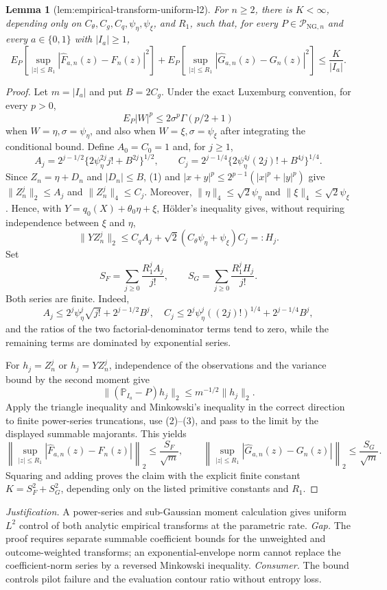 \documentclass{article}
\newtheorem{lemma}{Lemma}
\begin{document}
\begin{lemma}[lem:empirical-transform-uniform-l2]\label{lem:empirical-transform-uniform-l2}
For \(n\ge2\), there is \(K<\infty\), depending only on \(C_{\theta},C_g,C_q,\psi_{\eta},\psi_{\xi}\), and \(R_1\), such that, for every \(P\in\mathcal P_{\mathrm{NG},n}\) and every \(a\in\{0,1\}\) with \(|I_a|\ge1\),
\[
 E_P\!\left[\sup_{|z|\le R_1}|\widehat F_{a,n}(z)-F_n(z)|^2\right]
 +E_P\!\left[\sup_{|z|\le R_1}|\widehat G_{a,n}(z)-G_n(z)|^2\right]
 \le \frac{K}{|I_a|}.
\]
\end{lemma}
\begin{proof}
Let \(m=|I_a|\) and put \(B=2C_g\).  Under the exact Luxemburg convention, for every \(p>0\),
\[
 E_P|W|^p\le 2\sigma^p\Gamma(p/2+1) \tag{1}
\]
when \(W=\eta,\sigma=\psi_\eta\), and also when \(W=\xi,\sigma=\psi_\xi\) after integrating the conditional bound.  Define \(A_0=C_0=1\) and, for \(j\ge1\),
\[
 A_j=2^{j-1/2}\{2\psi_\eta^{2j}j!+B^{2j}\}^{1/2},\qquad
 C_j=2^{j-1/4}\{2\psi_\eta^{4j}(2j)!+B^{4j}\}^{1/4}.
\]
Since \(Z_n=\eta+D_n\) and \(|D_n|\le B\), (1) and \(|x+y|^p\le2^{p-1}(|x|^p+|y|^p)\) give \(\|Z_n^j\|_2\le A_j\) and \(\|Z_n^j\|_4\le C_j\).  Moreover, \(\|\eta\|_4\le\sqrt2\psi_\eta\) and \(\|\xi\|_4\le\sqrt2\psi_\xi\).  Hence, with \(Y=q_0(X)+\theta_0\eta+\xi\), Hölder's inequality gives, without requiring independence between \(\xi\) and \(\eta\),
\[
 \|YZ_n^j\|_2\le C_qA_j+\sqrt2(C_\theta\psi_\eta+\psi_\xi)C_j=:H_j. \tag{2}
\]
Set
\[
 S_F=\sum_{j\ge0}\frac{R_1^jA_j}{j!},\qquad S_G=\sum_{j\ge0}\frac{R_1^jH_j}{j!}.
\]
Both series are finite.  Indeed,
\[
 A_j\le2^j\psi_\eta^j\sqrt{j!}+2^{j-1/2}B^j,\quad
 C_j\le2^j\psi_\eta^j((2j)!)^{1/4}+2^{j-1/4}B^j,
\]
and the ratios of the two factorial-denominator terms tend to zero, while the remaining terms are dominated by exponential series.

For \(h_j=Z_n^j\) or \(h_j=YZ_n^j\), independence of the observations and the variance bound by the second moment give
\[
 \|(\mathbb P_{I_a}-P)h_j\|_2\le m^{-1/2}\|h_j\|_2. \tag{3}
\]
Apply the triangle inequality and Minkowski's inequality in the correct direction to finite power-series truncations, use (2)--(3), and pass to the limit by the displayed summable majorants.  This yields
\[
 \left\|\sup_{|z|\le R_1}|\widehat F_{a,n}(z)-F_n(z)|\right\|_2\le\frac{S_F}{\sqrt m},\qquad
 \left\|\sup_{|z|\le R_1}|\widehat G_{a,n}(z)-G_n(z)|\right\|_2\le\frac{S_G}{\sqrt m}.
\]
Squaring and adding proves the claim with the explicit finite constant \(K=S_F^2+S_G^2\), depending only on the listed primitive constants and \(R_1\).
\end{proof}
\par\smallskip\noindent \textit{Justification.} A power-series and sub-Gaussian moment calculation gives uniform \(L^2\) control of both analytic empirical transforms at the parametric rate. \textit{Gap.} The proof requires separate summable coefficient bounds for the unweighted and outcome-weighted transforms; an exponential-envelope norm cannot replace the coefficient-norm series by a reversed Minkowski inequality. \textit{Consumer.} The bound controls pilot failure and the evaluation contour ratio without entropy loss.
\end{document}
